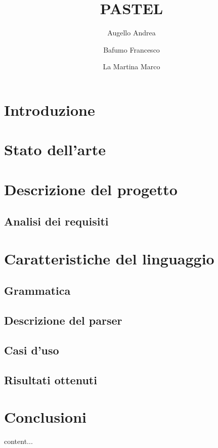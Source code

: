 \documentclass[]{article}
\title{PASTEL}
\author{{Augello Andrea} \and {Bafumo Francesco} \and{La Martina Marco}}
\begin{document}
\maketitle

\begin{abstract}
\end{abstract}

\section{Introduzione}
\section{Stato dell'arte}
\section{Descrizione del progetto}
\subsection{Analisi dei requisiti}
\section{Caratteristiche del linguaggio}
\subsection{Grammatica}
\subsection{Descrizione del parser}
\subsection{Casi d'uso}
\subsection{Risultati ottenuti}
\section{Conclusioni}

\begin{thebibliography}{widestlabel}
	content...
\end{thebibliography}
\end{document}
